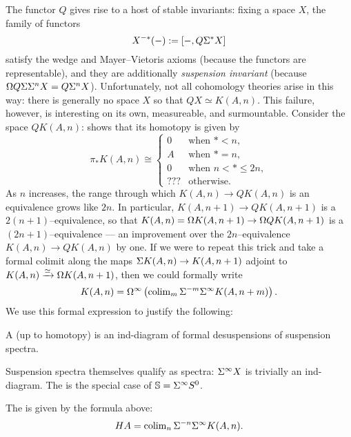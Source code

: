 The functor $Q$ gives rise to a host of stable invariants: fixing a space $X$, the family of functors \[X^{-*}(-) := [-, Q \Sigma^* X]\] satisfy the wedge and Mayer--Vietoris axioms (because the functors are representable), and they are additionally \emph{suspension invariant} (because $\Omega Q \Sigma \Sigma^n X = Q \Sigma^n X$).
Unfortunately, not all cohomology theories arise in this way: there is generally no space $X$ so that $QX \simeq K(A, n)$.
This failure, however, is interesting on its own, measureable, and surmountable.
Consider the space $QK(A, n)$:  shows that its homotopy is given by \[\pi_* K(A, n) \cong \begin{cases} 0 & \text{when $* < n$}, \\ A & \text{when $* = n$}, \\ 0 & \text{when $n < * \le 2n$}, \\ ??? & \text{otherwise}. \end{cases}\]
As $n$ increases, the range through which $K(A, n) \to QK(A, n)$ is an equivalence grows like $2n$.
In particular, $K(A, n+1) \to QK(A, n+1)$ is a $2(n+1)$--equivalence, so that $K(A, n) = \Omega K(A, n+1) \to \Omega QK(A, n+1)$ is a $(2n+1)$--equivalence --- an improvement over the $2n$--equivalence $K(A, n) \to QK(A, n)$ by one.
If we were to repeat this trick and take a formal colimit along the maps $\Sigma K(A, n) \to K(A, n+1)$ adjoint to $K(A, n) \xrightarrow\simeq \Omega K(A, n+1)$, then we could formally write \[K(A, n) = \Omega^\infty \left( \operatorname{colim}_m \Sigma^{-m} \Sigma^\infty K(A, n + m) \right).\]
%
We use this formal expression to justify the following:

\begin{definition}
A  (up to homotopy) is an ind-diagram of formal desuspensions of suspension spectra.
\end{definition}

\begin{example}
Suspension spectra themselves qualify as spectra: $\Sigma^\infty X$ is trivially an ind-diagram.
The  is the special case of $\mathbb S = \Sigma^\infty S^0$.
\end{example}

\begin{example}
The  is given by the formula above: \[HA = \operatorname{colim}_n \Sigma^{-n} \Sigma^\infty K(A, n).\]
\end{example}


